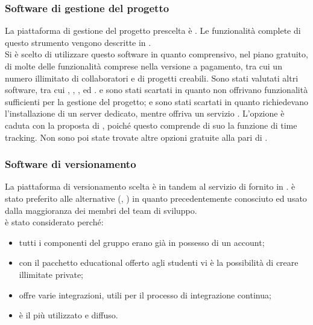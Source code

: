 \subsubsection{Software di gestione del progetto}
La piattaforma di gestione del progetto prescelta è \textbf{}. Le funzionalità complete di questo strumento vengono descritte in .\\
Si è scelto di utilizzare questo software in quanto comprensivo, nel piano gratuito, di molte delle funzionalità comprese nella versione a pagamento, tra cui un numero illimitato di collaboratori e di progetti creabili. Sono stati valutati altri software, tra cui , , ,  ed .  e  sono stati scartati in quanto non offrivano funzionalità sufficienti per la gestione del progetto;  e  sono stati scartati in quanto richiedevano l'installazione di un server dedicato, mentre  offriva un servizio . L'opzione  è caduta con la proposta di , poiché questo comprende di suo la funzione di time tracking. Non sono poi state trovate altre opzioni gratuite alla pari di .

\subsubsection{Software di versionamento}
La piattaforma di versionamento scelta è  in tandem al servizio di  fornito in .  è stato preferito alle alternative (, ) in quanto precedentemente conosciuto ed usato dalla maggioranza dei membri del team di sviluppo.\\
 è stato considerato perché:
\begin{itemize}
	\item tutti i componenti del gruppo erano già in possesso di un account;
	\item con il pacchetto educational offerto agli studenti vi è la possibilità di creare illimitate  private;
	\item offre varie integrazioni, utili per il processo di integrazione continua;
	\item è il più utilizzato e diffuso.
\end{itemize}

